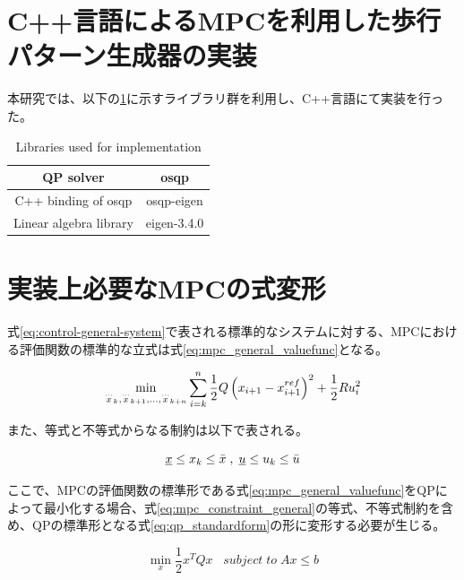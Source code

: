 \section{C++言語によるMPCを利用した歩行パターン生成器の実装}

本研究では、以下の\ref{tb:library}に示すライブラリ群を利用し、C++言語にて実装を行った。

\begin{table}[htbp]
  \centering
  \begin{tabular}{|c|c|} \hline
    QP solver              & osqp\cite{OSQP}            \\ \hline
    C++ binding of osqp    & osqp-eigen\cite{OSQPEIGEN} \\ \hline
    Linear algebra library & eigen-3.4.0\cite{EIGEN}    \\ \hline
  \end{tabular}
  \caption{Libraries used for implementation}
  \label{tb:library}
\end{table}


\section{実装上必要なMPCの式変形}
式\eqref{eq:control-general-system}で表される標準的なシステムに対する、MPCにおける評価関数の標準的な立式は式\eqref{eq:mpc_general_valuefunc}となる。

\begin{equation}
  \min_{{\buildrel\ldots\over{x}}_{k},{\buildrel\ldots\over{x}}_{k+1},\ldots,{\buildrel\ldots\over{x}}_{k+n}}\sum_{i=k}^{n}{1\over 2}Q\left(x_{i+1}-x_{i+1}^{ref}\right)^{2}+{1\over 2}R{u}_{i}^{2}
  \label{eq:mpc_general_valuefunc}
\end{equation}

また、等式と不等式からなる制約は以下で表される。

\begin{equation}
  \underbar{$x$} \leq x_{k} \leq  \bar{x} \; ,\; \underbar{$u$} \leq u_{k} \leq \bar{u}
  \label{eq:mpc_constraint_general}
\end{equation}


ここで、MPCの評価関数の標準形である式\eqref{eq:mpc_general_valuefunc}をQPによって最小化する場合、式\eqref{eq:mpc_constraint_general}の等式、不等式制約を含め、QPの標準形となる式\eqref{eq:qp_standardform}の形に変形する必要が生じる。

\begin{equation}
  \underset{x}{\min} \frac{1}{2}x^TQx \;\;\; subject \; to \; Ax \leq b
  \label{eq:qp_standardform}
\end{equation}

